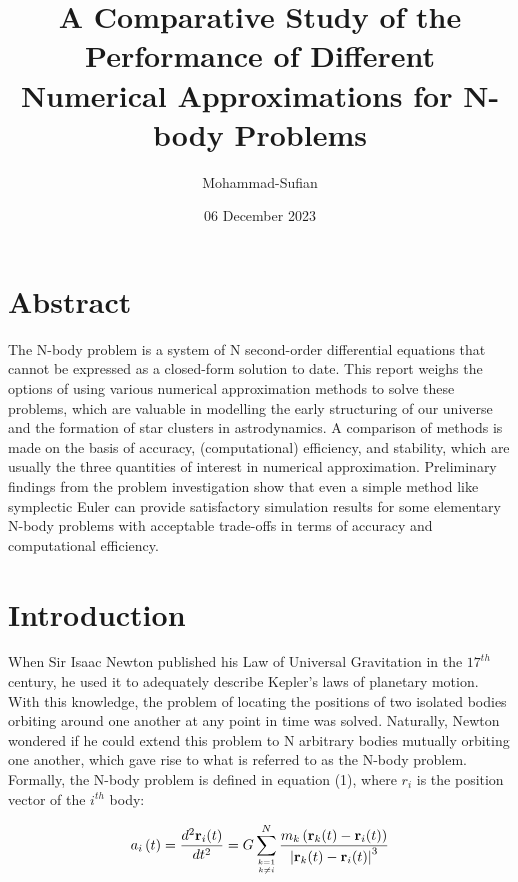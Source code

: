 \documentclass[a4paper,11pt]{article}
\title{A Comparative Study of the Performance of Different Numerical Approximations for N-body Problems}
\author{Mohammad-Sufian}
\date{06 December 2023}
\begin{document}
\thispagestyle{plain}
\maketitle

\section{Abstract}

The N-body problem is a system of N second-order differential equations that cannot be expressed as a closed-form solution to date. This report weighs the options of using various numerical approximation methods to solve these problems, which are valuable in modelling the early structuring of our universe and the formation of star clusters in astrodynamics. A comparison of methods is made on the basis of accuracy, (computational) efficiency, and stability, which are usually the three quantities of interest in numerical approximation. Preliminary findings from the problem investigation show that even a simple method like symplectic Euler can provide satisfactory simulation results for some elementary N-body problems with acceptable trade-offs in terms of accuracy and computational efficiency.

\section{Introduction}

When Sir Isaac Newton published his Law of Universal Gravitation in the $17 ^{th}$ century, he used it to adequately describe Kepler's laws of planetary motion. With this knowledge, the problem of locating the positions of two isolated bodies orbiting around one another at any point in time was solved. Naturally, Newton wondered if he could extend this problem to N arbitrary bodies mutually orbiting one another, which gave rise to what is referred to as the N-body problem. Formally, the N-body problem is defined in equation (1), where ${r} _{i}$ is the position vector of the $i ^{th}$ body:

\begin{equation}
    \label{ODE}
    a_{i} \left ( t \right ) = {\frac {d^{2}\mathbf {r} _{i}(t)}{dt^{2}}} = G\sum _{\genfrac{}{}{0pt}{}{k=1}{k\neq i}}^{N}{\frac {m_{k}\left(\mathbf {r} _{k}(t)-\mathbf {r} _{i}(t)\right)}{\left|\mathbf {r} _{k}(t)-\mathbf {r} _{i}(t)\right|^{3}}}
\end{equation}
\end{document}

